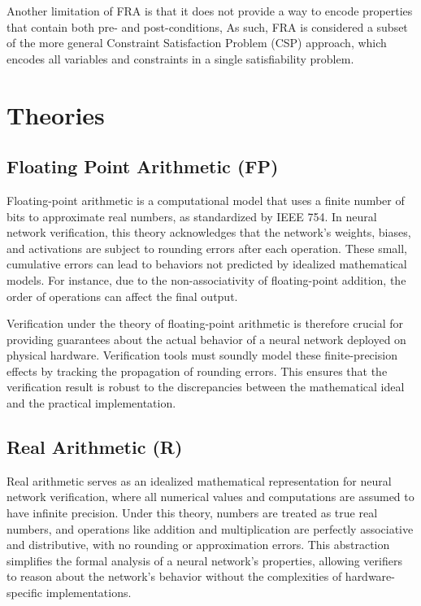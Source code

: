 Another limitation of FRA is that it does not provide a way to encode properties that contain both pre- and post-conditions, As such, 
FRA is considered a subset of the more general Constraint Satisfaction Problem (CSP) approach, which encodes all variables and constraints 
in a single satisfiability problem.

\section{Theories}

\subsection*{Floating Point Arithmetic (FP)}
Floating-point arithmetic is a computational model that uses a finite number of bits to approximate real numbers, as standardized by IEEE 754. 
In neural network verification, this theory acknowledges that the network's weights, biases, and activations are subject to rounding errors 
after each operation. These small, cumulative errors can lead to behaviors not predicted by idealized mathematical models. For instance, due to 
the non-associativity of floating-point addition, the order of operations can affect the final output.

Verification under the theory of floating-point arithmetic is therefore crucial for providing guarantees about the actual behavior of a neural 
network deployed on physical hardware. Verification tools must soundly model these finite-precision effects by tracking the propagation of rounding errors. 
This ensures that the verification result is robust to the discrepancies between the mathematical ideal and the practical implementation.

\subsection*{Real Arithmetic (R)}
Real arithmetic serves as an idealized mathematical representation for neural network verification, where all numerical values and computations are 
assumed to have infinite precision. Under this theory, numbers are treated as true real numbers, and operations like addition and multiplication 
are perfectly associative and distributive, with no rounding or approximation errors. This abstraction simplifies the formal analysis of a neural 
network's properties, allowing verifiers to reason about the network's behavior without the complexities of hardware-specific implementations.


